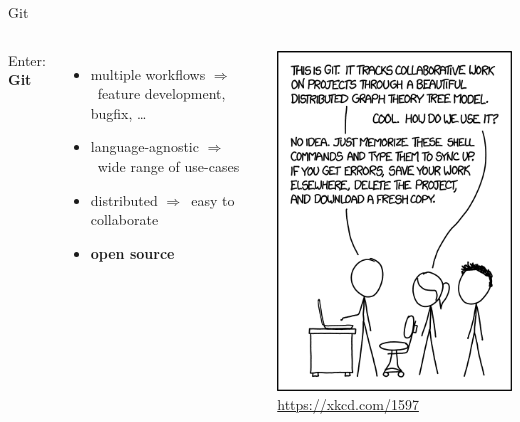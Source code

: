 \documentclass[10pt, graphics, aspectratio=169, table]{beamer}
\newcommand{\ra}{$\Rightarrow$\ }
\begin{document}
    \begin{frame}{Git}
        \begin{columns}
                Enter: \textbf{Git}
                \begin{itemize}
                    \item multiple workflows \ra feature development, bugfix, \ldots
                    \item language-agnostic \ra wide range of use-cases
                    \item distributed \ra easy to collaborate
                    \item \textbf{open source}
                \end{itemize}
                \center\includegraphics[scale=0.4]{img/git.png}
                \center\tiny\url{https://xkcd.com/1597}
        \end{columns}
    \end{frame}
\end{document}
